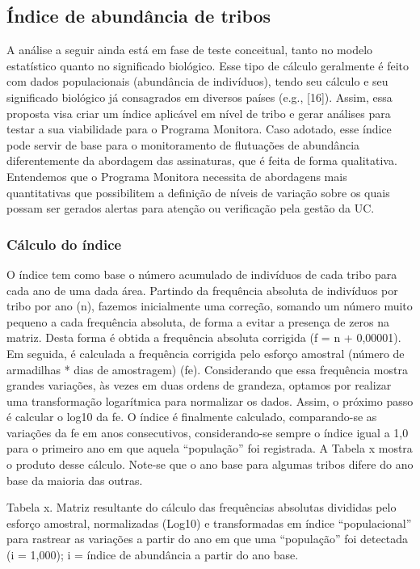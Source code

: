 \documentclass[
  letterpaper,
]{scrbook}
\begin{document}
\subsection{Índice de abundância de
tribos}\label{uxedndice-de-abunduxe2ncia-de-tribos}

A análise a seguir ainda está em fase de teste conceitual, tanto no
modelo estatístico quanto no significado biológico. Esse tipo de cálculo
geralmente é feito com dados populacionais (abundância de indivíduos),
tendo seu cálculo e seu significado biológico já consagrados em diversos
países (e.g., {[}16{]}). Assim, essa proposta visa criar um índice
aplicável em nível de tribo e gerar análises para testar a sua
viabilidade para o Programa Monitora. Caso adotado, esse índice pode
servir de base para o monitoramento de flutuações de abundância
diferentemente da abordagem das assinaturas, que é feita de forma
qualitativa. Entendemos que o Programa Monitora necessita de abordagens
mais quantitativas que possibilitem a definição de níveis de variação
sobre os quais possam ser gerados alertas para atenção ou verificação
pela gestão da UC.

\subsubsection{Cálculo do índice}\label{cuxe1lculo-do-uxedndice}

O índice tem como base o número acumulado de indivíduos de cada tribo
para cada ano de uma dada área. Partindo da frequência absoluta de
indivíduos por tribo por ano (n), fazemos inicialmente uma correção,
somando um número muito pequeno a cada frequência absoluta, de forma a
evitar a presença de zeros na matriz. Desta forma é obtida a frequência
absoluta corrigida (f = n + 0,00001). Em seguida, é calculada a
frequência corrigida pelo esforço amostral (número de armadilhas * dias
de amostragem) (fe). Considerando que essa frequência mostra grandes
variações, às vezes em duas ordens de grandeza, optamos por realizar uma
transformação logarítmica para normalizar os dados. Assim, o próximo
passo é calcular o log10 da fe. O índice é finalmente calculado,
comparando-se as variações da fe em anos consecutivos, considerando-se
sempre o índice igual a 1,0 para o primeiro ano em que aquela
``população'' foi registrada. A Tabela x mostra o produto desse cálculo.
Note-se que o ano base para algumas tribos difere do ano base da maioria
das outras.

Tabela x. Matriz resultante do cálculo das frequências absolutas
divididas pelo esforço amostral, normalizadas (Log10) e transformadas em
índice ``populacional'' para rastrear as variações a partir do ano em
que uma ``população'' foi detectada (i = 1,000); i = índice de
abundância a partir do ano base.
\end{document}
